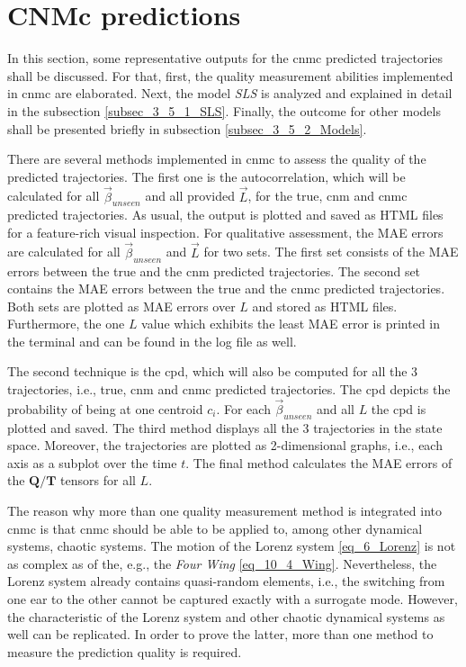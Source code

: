 \section{CNMc predictions}
\label{sec_3_5_Pred}
In this section, some representative outputs for the \gls{cnmc} predicted trajectories shall be discussed.
For that, first, the quality measurement abilities implemented in \gls{cnmc} are elaborated.
Next, the model \emph{SLS} is analyzed and explained in detail in the subsection \ref{subsec_3_5_1_SLS}.
Finally, the outcome for other models shall be presented briefly in subsection \ref{subsec_3_5_2_Models}.\newline

There are several methods implemented in \gls{cnmc} to assess the quality of the predicted trajectories.
The first one is the autocorrelation, which will be calculated for all $\vec{\beta}_{unseen}$ and all provided $\vec{L}$, for the true, \gls{cnm} and \gls{cnmc} predicted trajectories.
As usual, the output is plotted and saved as HTML files for a feature-rich visual inspection.
For qualitative assessment, the MAE errors are calculated for all $\vec{\beta}_{unseen}$ and $\vec{L}$ for two sets.
The first set consists of the MAE errors between the true and the \gls{cnm} predicted trajectories.
The second set contains the MAE errors between the true and the \gls{cnmc} predicted trajectories.
Both sets are plotted as MAE errors over $L$ and stored as HTML files.
Furthermore, the one $L$ value which exhibits the least MAE error is printed in the terminal and can be found in the log file as well. \newline

The second technique is the \gls{cpd}, which will also be computed for all the 3 trajectories, i.e., true, \gls{cnm} and \gls{cnmc} predicted trajectories.
The \gls{cpd} depicts the probability of being at one centroid $c_i$.
For each $\vec{\beta}_{unseen}$ and all $L$ the \gls{cpd} is plotted and saved.
The third method displays all the 3 trajectories in the state space.
Moreover, the trajectories are plotted as 2-dimensional graphs, i.e., each axis as a subplot over the time $t$.
The final method calculates the MAE errors of the $\bm Q / \bm T$ tensors for all $L$.\newline 

The reason why more than one quality measurement method is integrated into \gls{cnmc} is that \gls{cnmc} should be able to be applied to, among other dynamical systems, chaotic systems.
The motion of the Lorenz system \eqref{eq_6_Lorenz} is not as complex as of the, e.g., the \emph{Four Wing} \eqref{eq_10_4_Wing}.
Nevertheless, the Lorenz system already contains quasi-random elements, i.e., the switching from one ear to the other cannot be captured exactly with a surrogate mode. However, the characteristic of the Lorenz system and other chaotic dynamical systems as well can be replicated.
In order to prove the latter, more than one method to measure the prediction quality is required.